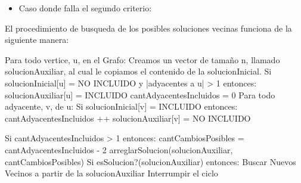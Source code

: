 \begin{itemize}
	\item Caso donde falla el segundo criterio:


\end{itemize}

El procedimiento de busqueda de los posibles soluciones vecinas funciona de la siguiente manera:

\begin{codesnippet}
Para todo vertice, u, en el Grafo:
  Creamos un vector de tamaño n, llamado solucionAuxiliar, al cual le copiamos
  el contenido de la solucionInicial.
  Si solucionInicial[u] = NO INCLUIDO y |adyacentes a u| > 1 entonces:
     solucionAuxiliar[u] = INCLUIDO
     cantAdyacentesIncluidos = 0
     Para todo adyacente, v, de u:
         Si solucionInicial[v] = INCLUIDO entonces:
             cantAdyacentesIncluidos ++
             solucionAuxiliar[v] = NO INCLUIDO

  Si cantAdyacentesIncluidos > 1 entonces:
     cantCambiosPosibles = cantAdyacentesIncluidos - 2
     arreglarSolucion(solucionAuxiliar, cantCambiosPosibles)
     Si esSolucion?(solucionAuxiliar) entonces:
       Buscar Nuevos Vecinos a partir de la solucionAuxiliar
       Interrumpir el ciclo

\end{codesnippet}

